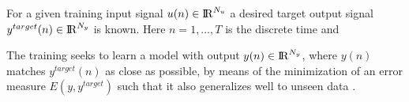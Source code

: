 For a given training input signal $u(n) \in \mathrm{I\negthinspace R}^{N_u}$ a desired target
output signal $y^{target}(n) \in \mathrm{I\negthinspace R}^{N_y}$ is known.
%
Here $n = 1,\ldots,T$ is the discrete time and 

The training seeks to learn a model with output $y(n) \in
\mathrm{I\negthinspace R}^{N_y}$, where $y(n)$ matches $y^{target}(n)$ as close as
possible, by means of the minimization of an error measure
$E(y,y^{target})$ such that it also generalizes well to unseen data
\citep{Lukose2012}.
